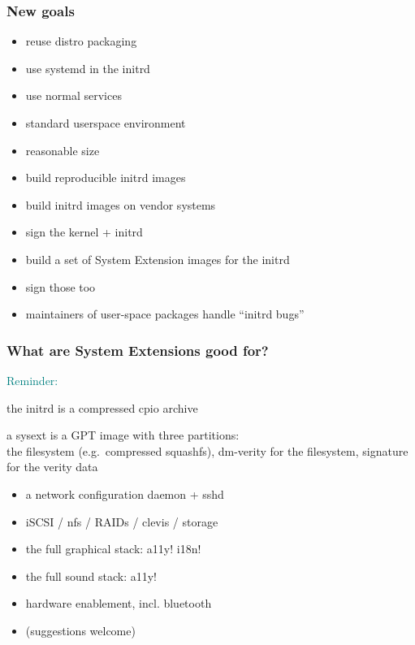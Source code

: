 \documentclass[]{beamer}
\newcommand\pp\pause
\begin{document}
\begin{frame}
  \frametitle{New goals}

  \begin{itemize}
    \pp
  \item reuse distro packaging
    \pp
  \item use systemd in the initrd
    \pp
  \item use normal services
    \pp
  \item standard userspace environment
    \pp
  \item reasonable size
    \pp

  \quad

  \item build reproducible initrd images
    \pp
  \item build initrd images on vendor systems
    \pp
  \item sign the kernel + initrd
    \pp
  \item build a set of System Extension images for the initrd
    \pp
  \item sign those too
    \pp

  \quad

  \item maintainers of user-space packages handle ``initrd bugs''
  \end{itemize}
\end{frame}

\begin{frame}
  \frametitle{What are System Extensions good for?}

  \pp
  \textcolor{teal}{Reminder:}{ }\begin{minipage}[t]{0.8\linewidth}
    the initrd is a compressed cpio archive

    \quad

    a sysext is a GPT image with
    three partitions:\\
    the filesystem (e.g.\ compressed squashfs),
    dm-verity for the filesystem,
    signature for the verity data
  \end{minipage}

  \quad

  \begin{itemize}
    \pp
  \item a network configuration daemon + sshd

    \pp
  \item iSCSI / nfs / RAIDs / clevis / storage

    \pp
  \item the full graphical stack\pp: a11y! \pp i18n!

    \pp
  \item the full sound stack\pp: a11y!

    \pp
  \item hardware enablement, incl. bluetooth

    \pp
  \item (suggestions welcome)
  \end{itemize}
\end{frame}
\end{document}
